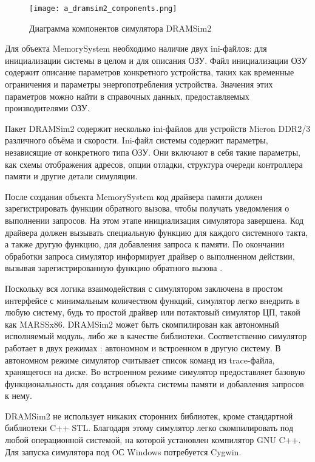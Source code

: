 \begin{figure}[ht]
\centering
  \texttt{[image: a\_dramsim2\_components.png]}  
  \caption{Диаграмма компонентов симулятора DRAMSim2}
  \label{fig:domain:simulators:dramsim2:dramsim2_component}
\end{figure}

Для объекта MemorySystem необходимо наличие двух ini-файлов: для инициализации системы в целом и для описания ОЗУ. Файл инициализации ОЗУ содержит описание параметров конкретного устройства, таких как временные ограничения и параметры энергопотребления устройства. Значения этих параметров можно найти в справочных данных, предоставляемых производителями ОЗУ.

Пакет DRAMSim2 содержит несколько ini-файлов для устройств Micron DDR2/3 различного объёма и скорости. Ini-файл системы содержит параметры, независящие от конкретного типа ОЗУ. Они включают в себя такие параметры, как схемы отображения адресов, опции отладки, структура очереди контроллера памяти и другие детали симуляции.

После создания объекта  MemorySystem код драйвера памяти должен зарегистрировать функции обратного вызова, чтобы получать уведомления о выполнении запросов. На этом этапе инициализация симулятора завершена. Код драйвера должен вызывать специальную функцию для каждого системного такта, а также другую функцию, для добавления запроса к памяти. По окончании обработки запроса симулятор информирует драйвер о выполненном действии, вызывая зарегистрированную функцию обратного вызова \cite{dramsim2_manual}.

Поскольку вся логика взаимодействия с симулятором заключена в простом интерфейсе с минимальным количеством функций, симулятор  легко внедрить в любую систему, будь то простой драйвер или потактовый симулятор ЦП, такой как MARSSx86. 
DRAMSim2 может быть скомпилирован как автономный исполняемый модуль, либо же в качестве библиотеки. Соответственно симулятор работает в двух режимах : автономном и встроенном в другую систему. В автономном режиме симулятор считывает список команд из trace-файла, хранящегося на диске. Во встроенном режиме симулятор предоставляет базовую функциональность для создания объекта системы памяти и добавления запросов к нему. 

DRAMSim2 не использует никаких сторонних библиотек, кроме стандартной библиотеки C++ STL. Благодаря этому симулятор легко скомпилировать под любой операционной системой, на которой установлен компилятор GNU C++. Для запуска симулятора под OС Windows потребуется Cygwin.

